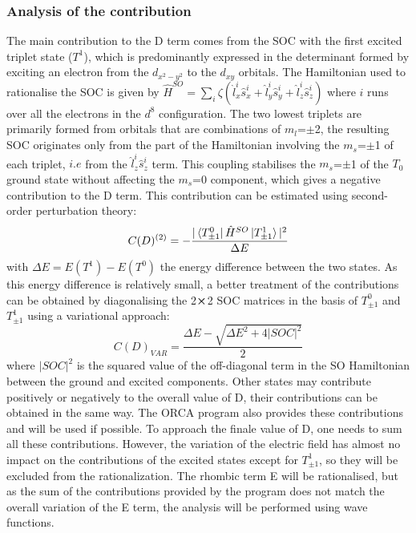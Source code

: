 \documentclass[12pt]{report}
\numberwithin{equation}{section}
\begin{document}
\subsubsection*{Analysis of the contribution}

The main contribution to the D term comes from the SOC with the first excited triplet state ($T^1$), which is predominantly expressed in the determinant formed by exciting an electron from the $d_{x^2-y^2}$ to the $d_{xy}$ orbitals.
The Hamiltonian used to rationalise the SOC is given by $\hat{H}^{SO}=\sum_{i} \zeta(\hat{l}_x^i\hat{s}_x^i+\hat{l}_y^i\hat{s}_y^i+\hat{l}_z^i\hat{s}_z^i)$ where $i$ runs over all the electrons in the $d^8$ configuration.
The two lowest triplets are primarily formed from orbitals that are combinations of $m_l$=$\pm$2, the resulting SOC originates only from the part of the Hamiltonian involving the $m_s$=$\pm$1 of each triplet, $i.e$ from the $\hat{l}_z^i\hat{s}_z^i$ term.
This coupling stabilises the $m_s$=$\pm$1 of the $T_0$ ground state without affecting the $m_s$=0 component, which gives a negative contribution to the D term.
This contribution can be estimated using second-order perturbation theory:
\begin{equation}\label{ContrPert}
    C(D)^{(2)}=-\frac{|\bra{T^0_{\pm1}}\hat{H}^{SO}\ket{T^1_{\pm1}}|^2}{\Delta E}
\end{equation}
with $\Delta E = E(T^1)-E(T^0)$ the energy difference between the two states.
As this energy difference is relatively small, a better treatment of the contributions can be obtained by diagonalising the 2$\cross$2 SOC matrices in the basis of $T^0_{\pm1}$ and $T^1_{\pm1}$ using a variational approach:
\begin{equation}
    C(D)_{VAR}=\frac{\Delta E -\sqrt{\Delta E^2+4|SOC|^2}}{2}
\end{equation}
where $|SOC|^2$ is the squared value of the off-diagonal term in the SO Hamiltonian between the ground and excited components.
Other states may contribute positively or negatively to the overall value of D, their contributions can be obtained in the same way. 
The ORCA program also provides these contributions and will be used if possible. To approach the finale value of D, one needs to sum all these contributions.
However, the variation of the electric field has almost no impact on the contributions of the excited states except for $T^1_{\pm1}$, so they will be excluded from the rationalization.
The rhombic term E will be rationalised, but as the sum of the contributions provided by the program does not match the overall variation of the E term, the analysis will be performed using wave functions.
\end{document}
